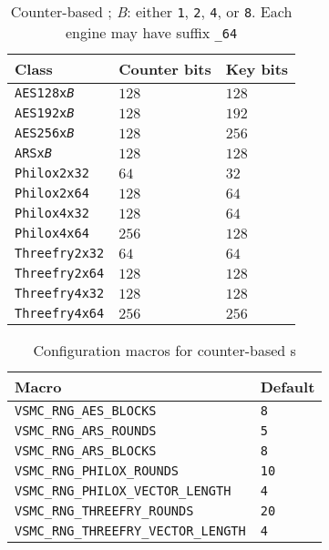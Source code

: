 \begin{table}
  \def\B{\textcolor{MRed}{\textit{B}}}
  \def\V{\textcolor{MRed}{\textit{V}}}
  \begin{tabularx}{\textwidth}{Xll}
    \toprule
    Class & Counter bits & Key bits \\
    \midrule
    \texttt{AES128x\B}        & $128$ & $128$ \\
    \texttt{AES192x\B}        & $128$ & $192$ \\
    \texttt{AES256x\B}        & $128$ & $256$ \\
    \texttt{ARSx\B}           & $128$ & $128$ \\
    \texttt{Philox2x32}       & $64$  & $32$  \\
    \texttt{Philox2x64}       & $128$ & $64$  \\
    \texttt{Philox4x32}       & $128$ & $64$  \\
    \texttt{Philox4x64}       & $256$ & $128$ \\
    \texttt{Threefry2x32}     & $64$  & $64$  \\
    \texttt{Threefry2x64}     & $128$ & $128$ \\
    \texttt{Threefry4x32}     & $128$ & $128$ \\
    \texttt{Threefry4x64}     & $256$ & $256$ \\
    \bottomrule
  \end{tabularx}
  \caption{Counter-based \rng; \B: either \texttt{1}, \texttt{2}, \texttt{4},
    or \texttt{8}. Each \rng engine may have suffix \texttt{\_64}}
  \label{tab:Counter-based RNG}
\end{table}

\begin{table}
  \begin{tabularx}{\textwidth}{XX}
    \toprule
    Macro & Default \\
    \midrule
    \verb|VSMC_RNG_AES_BLOCKS|             & \verb|8|  \\
    \verb|VSMC_RNG_ARS_ROUNDS|             & \verb|5|  \\
    \verb|VSMC_RNG_ARS_BLOCKS|             & \verb|8|  \\
    \verb|VSMC_RNG_PHILOX_ROUNDS|          & \verb|10| \\
    \verb|VSMC_RNG_PHILOX_VECTOR_LENGTH|   & \verb|4|  \\
    \verb|VSMC_RNG_THREEFRY_ROUNDS|        & \verb|20| \\
    \verb|VSMC_RNG_THREEFRY_VECTOR_LENGTH| & \verb|4|  \\
    \bottomrule
  \end{tabularx}
  \caption{Configuration macros for counter-based \rng{}s}
  \label{tab:Configuration macros for counter-based RNGs}
\end{table}

